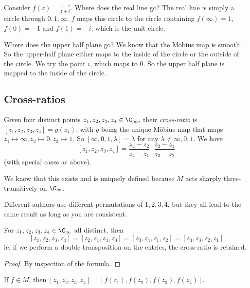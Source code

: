 \documentclass[a4paper]{article}
\begin{document}
\begin{eg}
  Consider $f(z) = \frac{z - i}{z + i}$. Where does the real line go? The real line is simply a circle through $0, 1, \infty$. $f$ maps this circle to the circle containing $f(\infty) = 1$, $f(0) = -1$ and $f(1) = -i$, which is the unit circle.

  Where does the upper half plane go? We know that the M\"obius map is smooth. So the upper-half plane either maps to the inside of the circle or the outside of the circle. We try the point $i$, which maps to $0$. So the upper half plane is mapped to the inside of the circle.
\end{eg}
\subsection{Cross-ratios}
\begin{defi}
  Given four distinct points $z_1, z_2, z_3, z_4\in \C_\infty,$ their \emph{cross-ratio} is $[z_1, z_2, z_3, z_4] = g(z_4)$, with $g$ being the unique M\"obius map that maps $z_1\mapsto \infty, z_2\mapsto 0, z_3\mapsto 1$.  So $[\infty, 0, 1, \lambda] = \lambda$ for any $\lambda\not= \infty, 0, 1$. We have
  \[
    [z_1, z_2, z_3, z_4] = \frac{z_4 - z_2}{z_4 - z_1} \cdot \frac{z_3 - z_1}{z_3 - z_2}
  \]
  (with special cases as above).
\end{defi}
We know that this exists and is uniquely defined because $M$ acts sharply three-transitively on $\C_\infty$.

\note Different authors use different permutations of $1, 2, 3, 4$, but they all lead to the same result as long as you are consistent.

\begin{lemma}
  For $z_1, z_2, z_3, z_4\in \C_\infty$ all distinct, then
  \[
    [z_1, z_2, z_3, z_4] = [z_2, z_1, z_4, z_3] = [z_3, z_4, z_1, z_2] = [z_4, z_3, z_2, z_1]
  \]
  ie. if we perform a double transposition on the entries, the cross-ratio is retained.
\end{lemma}

\begin{proof}
  By inspection of the formula.
\end{proof}

\begin{prop}
  If $f\in M$, then $[z_1, z_2, z_3, z_4] = [f(z_1), f(z_2), f(z_3), f(z_4)]$.
\end{prop}
\end{document}
